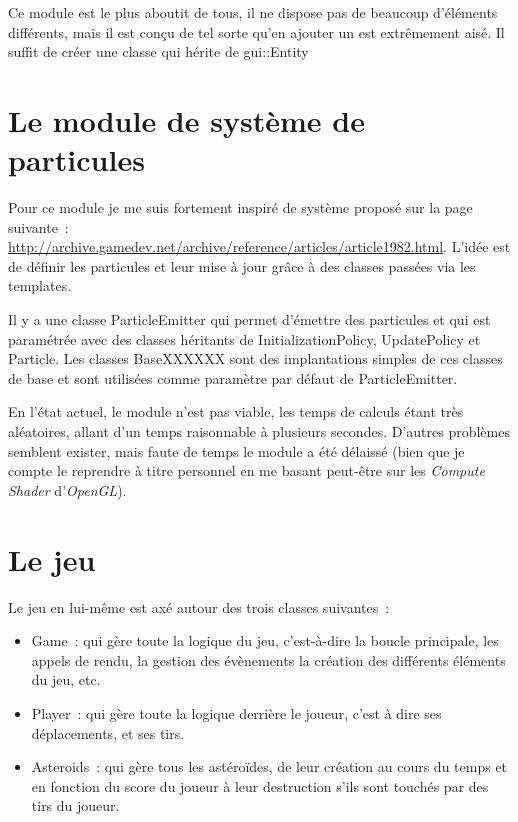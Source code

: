 \documentclass[10pt, french, a4paper]{report}
\newcommand{\class}[1]{{\codefont \NoAutoSpacing \mbox{#1}}}
\begin{document}
Ce module est le plus aboutit de tous, il ne dispose pas de beaucoup d'éléments
différents, mais il est conçu de tel sorte qu'en ajouter un est extrêmement aisé.
Il suffit de créer une classe qui hérite de \class{gui::Entity} 

\section{Le module de système de particules}
 
Pour ce module je me suis fortement inspiré de système proposé sur la page suivante~:
\url{http://archive.gamedev.net/archive/reference/articles/article1982.html}.
L'idée est de définir les particules et leur mise à jour grâce à des classes
passées via les templates.

Il y a une classe \class{ParticleEmitter} qui permet d'émettre des particules et qui 
est paramétrée avec des classes héritants de \class{InitializationPolicy}, 
\class{UpdatePolicy} et \class{Particle}. 
Les classes \class{BaseXXXXXX} sont des implantations simples de ces classes de base et
sont utilisées comme paramètre par défaut de \class{ParticleEmitter}.

En l'état actuel, le module n'est pas viable, les temps de calculs étant très aléatoires,
allant d'un temps raisonnable à plusieurs secondes. D'autres problèmes semblent
exister, mais faute de temps le module a été délaissé (bien que je compte le reprendre
à titre personnel en me basant peut-être sur les \textit{Compute Shader} 
d'\textit{OpenGL}).

\section{Le jeu}

Le jeu en lui-même est axé autour des trois classes suivantes~:
\begin{itemize}
	\item \class{Game}~: qui gère toute la logique du jeu, c'est-à-dire la boucle
		  principale, les appels de rendu, la gestion des évènements la création
		  des différents éléments du jeu, etc.
	\item \class{Player}~: qui gère toute la logique derrière le joueur, c'est à dire
		  ses déplacements, et ses tirs.
	\item \class{Asteroids}~: qui gère tous les astéroïdes, de leur création au cours
		  du temps et en fonction du score du joueur à leur destruction s'ils sont
		  touchés par des tirs du joueur. 
\end{itemize}
\end{document}
